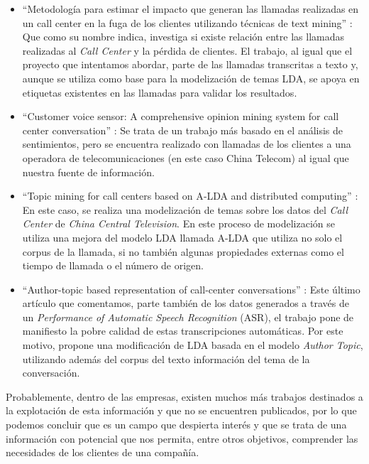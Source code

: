 \begin{itemize}
	\item ``Metodología para estimar el impacto que generan las llamadas realizadas en un call center en la fuga de los clientes utilizando técnicas de text mining'' \cite{call1}: Que como su nombre indica, investiga si existe relación entre las llamadas realizadas al \textit{Call Center} y la pérdida de clientes. El trabajo, al igual que el proyecto que intentamos abordar, parte de las llamadas transcritas a texto y, aunque se utiliza como base para la modelización de temas LDA, se apoya en etiquetas existentes en las llamadas para validar los resultados.
	
	\item ``Customer voice sensor: A comprehensive opinion mining system for call center conversation'' \cite{call2}: Se trata de un trabajo más basado en el análisis de sentimientos, pero se encuentra realizado con llamadas de los clientes a una operadora de telecomunicaciones (en este caso China Telecom) al igual que nuestra fuente de información.
	
	\item ``Topic mining for call centers based on A‐LDA and distributed computing'' \cite{call3}: En este caso, se realiza una modelización de temas sobre  los datos del \textit{Call Center} de \textit{China Central Television}. En este proceso de modelización se utiliza  una mejora del modelo LDA llamada A-LDA que utiliza no solo el corpus de la llamada, si no también algunas propiedades externas como el tiempo de llamada o el número de origen.
	
	\item ``Author-topic based representation of call-center conversations'' \cite{call4}: Este último artículo que comentamos, parte también de los datos generados a través de un \textit{Performance of Automatic Speech Recognition} (ASR), el trabajo pone de manifiesto la pobre calidad de estas transcripciones automáticas. Por este motivo, propone una modificación de LDA basada en el modelo \textit{Author Topic}, utilizando además del corpus del texto información del tema de la conversación.
\end{itemize}


Probablemente, dentro de las empresas, existen muchos más trabajos destinados a la explotación de esta información y que no se encuentren publicados, por lo que podemos concluir que es un campo que despierta interés y que se trata de una información con potencial que nos permita, entre otros objetivos, comprender las necesidades de los clientes de una compañía.

